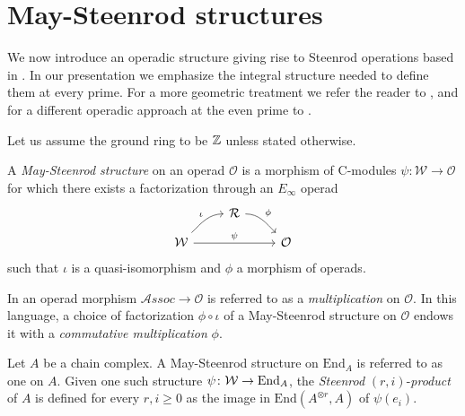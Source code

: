 
\section{May-Steenrod structures} \label{s:steenrod}

We now introduce an operadic structure giving rise to Steenrod operations based in \cite{may70generalapproach}.
In our presentation we emphasize the integral structure needed to define them at every prime.
For a more geometric treatment we refer the reader to \cites{may72geometry, may76homology, lawson2020n}, and for a different operadic approach at the even prime to \cite{chataur2005adem-cartan}.

Let us assume the ground ring to be $\mathbb{Z}$ unless stated otherwise.
\begin{definition} \label{def: May-Steenrod structure}
	A \textit{May-Steenrod structure} on an operad $\mathcal O$ is a 
	morphism of $\mathrm{C}$-modules $\psi \colon \mathcal W \to \mathcal O$ for which there exists a factorization through an $E_\infty$ operad
	\begin{equation*}
	\begin{tikzcd}[column sep = normal, row sep = small]
	& \mathcal R \arrow[dr, "\phi", out=0] & \\
	\mathcal W \arrow[ur, "\iota", in=180] \arrow[rr, "\psi"] & & \mathcal O
	\end{tikzcd}
	\end{equation*}
	such that $\iota$ is a quasi-isomorphism and $\phi$ a morphism of operads.
\end{definition}

\begin{remark} \label{rmk: Deligne conjecture}
	In \cite{GerstenhaberVoronov} an operad morphism $\mathcal{A}ssoc \to \mathcal O$ is referred to as a \textit{multiplication} on $\mathcal O$.
	In this language, a choice of factorization $\phi \circ \iota$ of a May-Steenrod structure on $\mathcal O$ endows it with a \textit{commutative multiplication} $\phi$.
\end{remark}

\begin{definition} \label{def: Steenrod products}
	Let $A$ be a chain complex.
	A May-Steenrod structure on $\mathrm{End}_A$ is referred to as one on $A$.
	Given one such structure $\psi \colon \mathcal W \to \mathrm{End}_A$, the \textit{Steenrod} $(r, i)$-\textit{product} of $A$ is defined for every $r, i \geq 0$ as the image in $ \mathrm{End}(A^{\otimes r}, A)$ of $\psi(e_i)$.
\end{definition}

